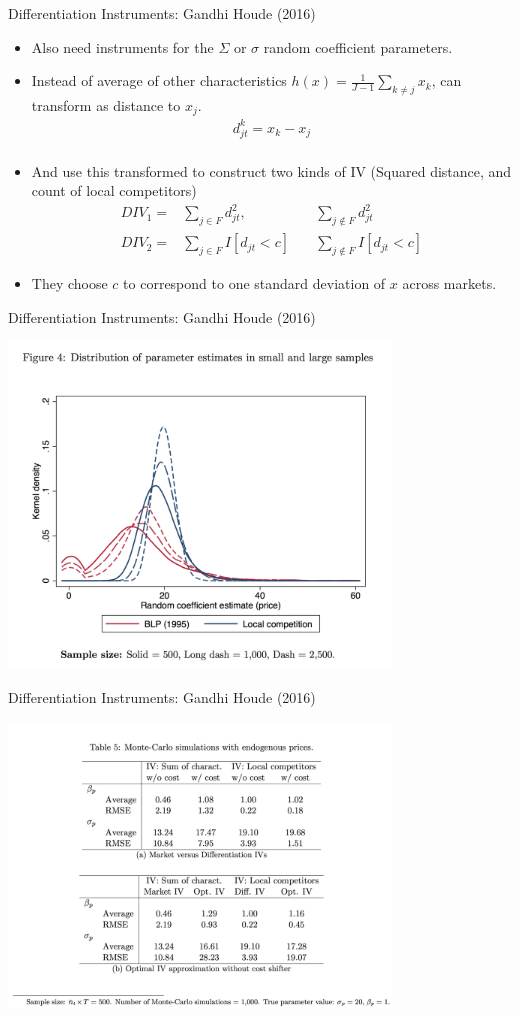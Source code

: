 \documentclass[xcolor=pdftex,dvipsnames,table,mathserif,aspectratio=169]{beamer}
\begin{document}
\begin{frame}{Differentiation Instruments: Gandhi Houde (2016)}
\begin{itemize}
\item Also need instruments for the $\Sigma$ or $\sigma$ random coefficient parameters.
\item Instead of average of other characteristics $h(x) = \frac{1}{J-1} \sum_{k \neq j} x_k$, can transform as distance to $x_j$.
\begin{eqnarray*}
d_{jt} ^k=  x_k - x_j  \\
\end{eqnarray*}
\item And use this transformed to construct two kinds of IV (Squared distance, and count of local competitors)
\begin{eqnarray*}
DIV_1 =& \sum_{j \in F}  d_{jt}^2,  \quad &\sum_{j \notin F}  d_{jt}^2 \\
DIV_2 =& \sum_{j \in F}  I[d_{jt} < c]   \quad &\sum_{j \notin F}   I[d_{jt} < c]
\end{eqnarray*}
\item They choose $c$ to correspond to one standard deviation of $x$ across markets.
\end{itemize}
\end{frame}


\begin{frame}{Differentiation Instruments: Gandhi Houde (2016)}
\begin{center}
\includegraphics[width=4in]{resources/d_iv1.png}
\end{center}
\end{frame}


\begin{frame}{Differentiation Instruments: Gandhi Houde (2016)}
\begin{center}
\includegraphics[width=4in]{resources/d_iv2.png}
\end{center}
\end{frame}
\end{document}
